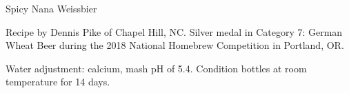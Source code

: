 \begin{recipe}{Spicy Nana Weissbier} %

\begin{aboutblock}
Recipe by Dennis Pike of Chapel Hill, NC. Silver medal in Category 7: German Wheat
Beer during the 2018 National Homebrew Competition in Portland, OR. \sourceaha
\end{aboutblock}


\begin{methodandtiming}
 
\begin{mashsteps}
\end{mashsteps}

\begin{fermentationsteps}
\end{fermentationsteps}

\begin{directions}
Water adjustment:  calcium, mash pH of 5.4. Condition bottles at
room temperature for 14 days.
\end{directions}

\end{methodandtiming}

\recipebreak

\begin{ingredientsblock}

\begin{malts}
\end{malts}

\begin{hops}
\end{hops}


\begin{twists}
\end{twists}

\end{ingredientsblock}

\end{recipe}

